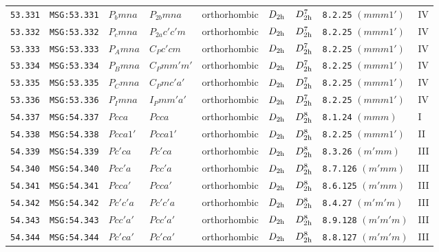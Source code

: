 \documentclass[fleqn,10pt]{jsarticle}
\begin{document}
\begin{center}
\begin{longtable}{lllllllll}
\texttt{53.331} & \texttt{MSG:53.331} & $P_{b}mna$ & $P_{2b}mna$ & orthorhombic & $D_{\rm 2h}$ & $D_{\rm 2h}^{7}$ & \texttt{8.2.25} $(mmm1')$ & IV \\
\texttt{53.332} & \texttt{MSG:53.332} & $P_{c}mna$ & $P_{2a}c'c'm$ & orthorhombic & $D_{\rm 2h}$ & $D_{\rm 2h}^{7}$ & \texttt{8.2.25} $(mmm1')$ & IV \\
\texttt{53.333} & \texttt{MSG:53.333} & $P_{A}mna$ & $C_{P}c'cm$ & orthorhombic & $D_{\rm 2h}$ & $D_{\rm 2h}^{7}$ & \texttt{8.2.25} $(mmm1')$ & IV \\
\texttt{53.334} & \texttt{MSG:53.334} & $P_{B}mna$ & $C_{P}mm'm'$ & orthorhombic & $D_{\rm 2h}$ & $D_{\rm 2h}^{7}$ & \texttt{8.2.25} $(mmm1')$ & IV \\
\texttt{53.335} & \texttt{MSG:53.335} & $P_{C}mna$ & $C_{P}mc'a'$ & orthorhombic & $D_{\rm 2h}$ & $D_{\rm 2h}^{7}$ & \texttt{8.2.25} $(mmm1')$ & IV \\
\texttt{53.336} & \texttt{MSG:53.336} & $P_{I}mna$ & $I_{P}mm'a'$ & orthorhombic & $D_{\rm 2h}$ & $D_{\rm 2h}^{7}$ & \texttt{8.2.25} $(mmm1')$ & IV \\ \hline
\texttt{54.337} & \texttt{MSG:54.337} & $Pcca$ & $Pcca$ & orthorhombic & $D_{\rm 2h}$ & $D_{\rm 2h}^{8}$ & \texttt{8.1.24} $(mmm)$ & I \\
\texttt{54.338} & \texttt{MSG:54.338} & $Pcca1'$ & $Pcca1'$ & orthorhombic & $D_{\rm 2h}$ & $D_{\rm 2h}^{8}$ & \texttt{8.2.25} $(mmm1')$ & II \\
\texttt{54.339} & \texttt{MSG:54.339} & $Pc'ca$ & $Pc'ca$ & orthorhombic & $D_{\rm 2h}$ & $D_{\rm 2h}^{8}$ & \texttt{8.3.26} $(m'mm)$ & III \\
\texttt{54.340} & \texttt{MSG:54.340} & $Pcc'a$ & $Pcc'a$ & orthorhombic & $D_{\rm 2h}$ & $D_{\rm 2h}^{8}$ & \texttt{8.7.126} $(m'mm)$ & III \\
\texttt{54.341} & \texttt{MSG:54.341} & $Pcca'$ & $Pcca'$ & orthorhombic & $D_{\rm 2h}$ & $D_{\rm 2h}^{8}$ & \texttt{8.6.125} $(m'mm)$ & III \\
\texttt{54.342} & \texttt{MSG:54.342} & $Pc'c'a$ & $Pc'c'a$ & orthorhombic & $D_{\rm 2h}$ & $D_{\rm 2h}^{8}$ & \texttt{8.4.27} $(m'm'm)$ & III \\
\texttt{54.343} & \texttt{MSG:54.343} & $Pcc'a'$ & $Pcc'a'$ & orthorhombic & $D_{\rm 2h}$ & $D_{\rm 2h}^{8}$ & \texttt{8.9.128} $(m'm'm)$ & III \\
\texttt{54.344} & \texttt{MSG:54.344} & $Pc'ca'$ & $Pc'ca'$ & orthorhombic & $D_{\rm 2h}$ & $D_{\rm 2h}^{8}$ & \texttt{8.8.127} $(m'm'm)$ & III \\

\end{longtable}
\end{center}
\end{document}
